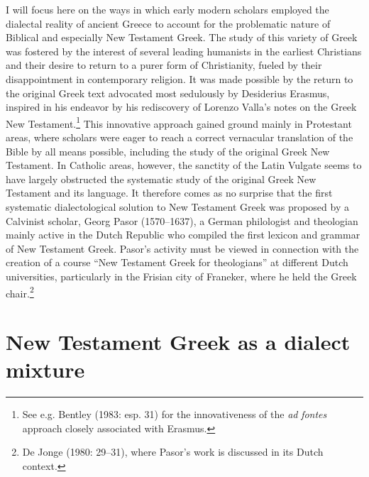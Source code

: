 I will focus here on the ways in which early modern scholars employed the dialectal reality of ancient Greece to account for the problematic nature of Biblical and especially New Testament Greek. The study of this variety of Greek was fostered by the interest of several leading humanists in the earliest Christians and their desire to return to a purer form of Christianity, fueled by their disappointment in contemporary religion. It was made possible by the return to the original Greek text advocated most sedulously by Desiderius Erasmus, inspired in his endeavor by his rediscovery of Lorenzo Valla’s notes on the Greek New Testament.\footnote{See e.g. Bentley (1983: esp. 31) for the innovativeness of the \textit{ad} \textit{fontes} approach closely associated with Erasmus.} This innovative approach gained ground mainly in Protestant areas, where scholars were eager to reach a correct vernacular translation of the Bible by all means possible, including the study of the original Greek New Testament. In Catholic areas, however, the sanctity of the Latin Vulgate seems to have largely obstructed the systematic study of the original Greek New Testament and its language. It therefore comes as no surprise that the first systematic dialectological solution to New Testament Greek was proposed by a Calvinist scholar, Georg Pasor (1570–1637), a German philologist and theologian mainly active in the Dutch Republic who compiled the first lexicon and grammar of New Testament Greek. Pasor’s activity must be viewed in connection with the creation of a course “New Testament Greek for theologians” at different Dutch universities, particularly in the Frisian city of Franeker, where he held the Greek chair.\footnote{De Jonge (1980: 29–31), where Pasor’s work is discussed in its Dutch context.}

\section{New Testament Greek as a dialect mixture}

